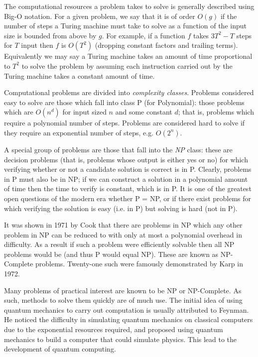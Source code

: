 The computational resources a problem takes to solve is generally described using Big-O notation.\cite{qcbook}  For a given problem, we say that it is of order $O(g)$ if the number of steps a Turing machine must take to solve as a function of the input size is bounded from above by $g$.  For example, if a function $f$ takes $3T^2 - T$ steps for $T$ input then $f$ is $O(T^2)$ (dropping constant factors and trailing terms).  Equivalently we may say a Turing machine takes an amount of time proportional to $T^2$ to solve the problem by assuming each instruction carried out by the Turing machine takes a constant amount of time.

Computational problems are divided into \emph{complexity classes}.  Problems considered easy to solve are those which fall into class P (for Polynomial): those problems which are $O(n^d)$ for input sized $n$ and some constant $d$; that is, problems which require a polynomial number of steps.  Problems are considered hard to solve if they require an exponential number of steps, e.g. $O(2^n)$.

A special group of problems are those that fall into the \emph{NP} class: these are decision problems (that is, problems whose output is either yes or no) for which verifying whether or not a candidate solution is correct is in P.  Clearly, problems in P must also be in NP; if we can construct a solution in a polynomial amount of time then the time to verify is constant, which is in P.  It is one of the greatest open questions of the modern era whether P = NP, or if there exist problems for which verifying the solution is easy (i.e. in P) but solving is hard (not in P).

It was shown in 1971 by Cook\cite{sat} that there are problems in NP which any other problem in NP can be reduced to with only at most a polynomial overhead in difficulty.  As a result if such a problem were efficiently solvable then all NP problems would be (and thus P would equal NP).  These are known as NP-Complete problems.  Twenty-one such were famously demonstrated by Karp in 1972.\cite{karp}

Many problems of practical interest are known to be NP or NP-Complete.  As such, methods to solve them quickly are of much use.  The initial idea of using quantum mechanics to carry out computation is usually attributed to Feynman.\cite{feynman}  He noticed the difficulty in simulating quantum mechanics on classical computers due to the exponential resources required, and proposed using quantum mechanics to build a computer that could simulate physics.  This lead to the development of quantum computing.

